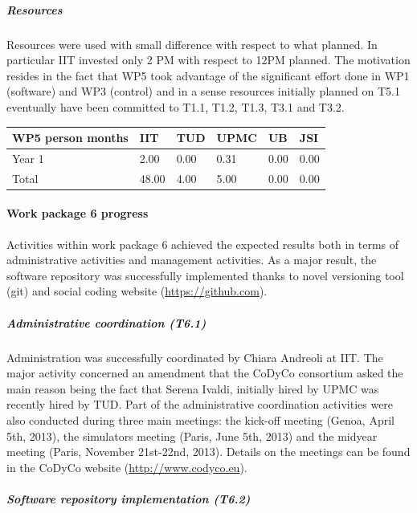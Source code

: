 \documentclass[12pt,a4paper,twoside]{article}
\begin{document}
\subparagraph{Resources}

Resources were used with small difference with respect to what planned. In particular IIT invested only 2 PM with respect to 12PM planned. The motivation resides in the fact that WP5 took advantage of the significant effort done in WP1 (software) and WP3 (control) and in a sense resources initially planned on T5.1 eventually have been committed to T1.1, T1.2, T1.3, T3.1 and T3.2.

\begin{center}
\begin{tabular}{|C{1.5cm}|C{1.5cm}|C{1.5cm}|C{2cm}|C{2cm}|C{2cm}|}
\hline
\footnotesize \textbf{WP5 person months}& \footnotesize \textbf{IIT}&\footnotesize \textbf{TUD}&\footnotesize \textbf{UPMC}& \footnotesize \textbf{UB} &\footnotesize \textbf{JSI}\\ \hline
\footnotesize Year 1 &  2.00 & 0.00 & 0.31 & 0.00 & 0.00      \\  \hline
\footnotesize Total &  48.00 & 4.00 & 5.00 & 0.00 & 0.00 \\ \hline
\end{tabular}
\end{center}

\paragraph{Work package 6 progress}

Activities within work package 6 achieved the expected results both in terms of administrative activities and management activities. As a major result, the software repository was successfully implemented thanks to novel versioning tool (git) and social coding website (\url{https://github.com}).

\subparagraph{Administrative coordination (T6.1)}
Administration was successfully coordinated by Chiara Andreoli at IIT. The major activity concerned an amendment that the CoDyCo consortium asked the main reason being the fact that Serena Ivaldi, initially hired by UPMC was recently hired by TUD. Part of the administrative coordination activities were also conducted during three main meetings: the kick-off meeting (Genoa, April 5th, 2013), the simulators meeting (Paris, June 5th, 2013) and the midyear meeting (Paris, November 21st-22nd, 2013). Details on the meetings can be found in the CoDyCo website (\url{http://www.codyco.eu}).

\subparagraph{Software repository implementation (T6.2)}
\end{document}
